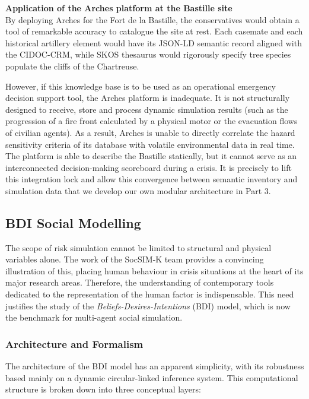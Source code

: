 \documentclass{article}
\begin{document}
\begin{filrouge}
\textbf{Application of the Arches platform at the Bastille site} \\
By deploying Arches for the Fort de la Bastille, the conservatives would obtain a tool of remarkable accuracy to catalogue the site at rest. Each casemate and each historical artillery element would have its JSON-LD semantic record aligned with the CIDOC-CRM, while SKOS thesaurus would rigorously specify tree species populate the cliffs of the Chartreuse.

However, if this knowledge base is to be used as an operational emergency decision support tool, the Arches platform is inadequate. It is not structurally designed to receive, store and process dynamic simulation results (such as the progression of a fire front calculated by a physical motor or the evacuation flows of civilian agents). As a result, Arches is unable to directly correlate the hazard sensitivity criteria of its database with volatile environmental data in real time. The platform is able to describe the Bastille statically, but it cannot serve as an interconnected decision-making scoreboard during a crisis. It is precisely to lift this integration lock and allow this convergence between semantic inventory and simulation data that we develop our own modular architecture in Part 3.
\end{filrouge}
\subsection{BDI Social Modelling}

The scope of risk simulation cannot be limited to structural and physical variables alone. The work of the SocSIM-K team provides a convincing illustration of this, placing human behaviour in crisis situations at the heart of its major research areas. Therefore, the understanding of contemporary tools dedicated to the representation of the human factor is indispensable. This need justifies the study of the \emph{Beliefs-Desires-Intentions} (BDI) model, which is now the benchmark for multi-agent social simulation.

\subsubsection{Architecture and Formalism }

The architecture of the BDI model has an apparent simplicity, with its robustness based mainly on a dynamic circular-linked inference system. This computational structure is broken down into three conceptual layers:
\end{document}
